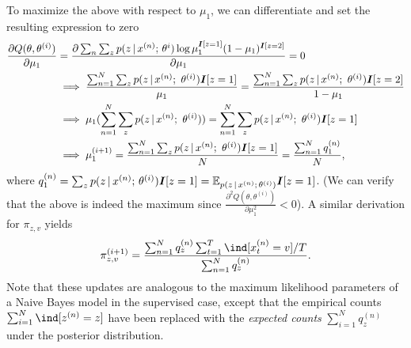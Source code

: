 \documentclass{article}
\begin{document}
\begin{enumerate}
To maximize the above with respect to $\mu_1$, we can differentiate and set the resulting expression to zero 
\begin{align*}
\frac{\partial Q(\theta, \theta^{(i)})}{\partial \mu_1} &= \frac{\partial \sum_{n} \sum_{z} p(z \given x^{(n)} \param \theta^i) \log \mu_1^{\ident[z=1]} (1-\mu_1)^ {\ident[z=2]}}{\partial \mu_1}   = 0 \\
&\implies \frac{\sum_{n=1}^N \sum_z p(z \given x^{(n)} ; \ \theta^{(i)}) \ident[z=1]}{\mu_1} = \frac{\sum_{n=1}^N \sum_z p(z \given x^{(n)} ; \ \theta^{(i)}) \ident[z=2]}{1-\mu_1} \\ 
&\implies \mu_1 (\sum_{n=1}^N \sum_z p(z \given x^{(n)} ; \ \theta^{(i)})) = \sum_{n=1}^N \sum_z p(z \given x^{(n)} ; \ \theta^{(i)}) \ident[z=1] \\
&\implies \mu_1^{(i+1)} = \frac{\sum_{n=1}^N \sum_z p(z \given x^{(n)} ; \ \theta^{(i)}) \ident[z=1]}{N} = \frac{\sum_{n=1}^N q^{(n)}_1}{N},
\end{align*}
where $q^{(n)}_1 = \sum_{z} p(z \,|\, x^{(n)} ; \, \theta^{(i)}) \boldsymbol{I}[z = 1] = \mathbb{E}_{p(z \,|\, x^{(n)} ; \, \theta^{(i)})} \boldsymbol{I}[z=1]$.
(We can verify that the above is indeed the maximum since $\frac{\partial^2 Q(\theta, \theta^{(i)})}{\partial \mu_1^2} < 0$). A similar derivation for $\pi_{z,v}$ yields
\begin{align*}
\pi_{z,v}^{(i+1)} = \frac{\sum_{n=1}^N q^{(n)}_z \sum_{t=1}^T \ind[x^{(n)}_t = v] / T}{\sum_{n=1}^N q^{(n)}_z}.
\end{align*}
Note that these updates are analogous to the maximum likelihood parameters of a Naive Bayes model in the supervised case, except
that the empirical counts  $\sum_{i=1}^N \ind[z^{(n)} = z]$ have been replaced with the \emph{expected counts} $\sum_{i=1}^N q_z^{(n)}$ under the posterior distribution. 
\end{enumerate}
\end{document}
